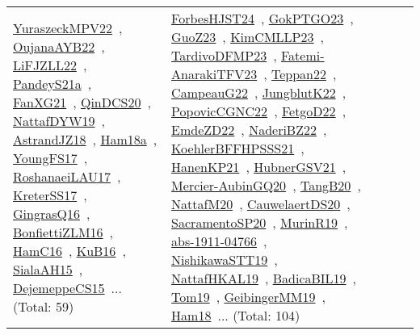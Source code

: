 {\begin{longtable}{lp{3cm}>{\raggedright\arraybackslash}p{6cm}>{\raggedright\arraybackslash}p{6cm}>{\raggedright\arraybackslash}p{8cm}}
\href{../works/YuraszeckMPV22.pdf}{YuraszeckMPV22}~\cite{YuraszeckMPV22}, \href{../works/OujanaAYB22.pdf}{OujanaAYB22}~\cite{OujanaAYB22}, \href{../works/LiFJZLL22.pdf}{LiFJZLL22}~\cite{LiFJZLL22}, \href{../works/PandeyS21a.pdf}{PandeyS21a}~\cite{PandeyS21a}, \href{../works/FanXG21.pdf}{FanXG21}~\cite{FanXG21}, \href{../works/QinDCS20.pdf}{QinDCS20}~\cite{QinDCS20}, \href{../works/NattafDYW19.pdf}{NattafDYW19}~\cite{NattafDYW19}, \href{../works/AstrandJZ18.pdf}{AstrandJZ18}~\cite{AstrandJZ18}, \href{../works/Ham18a.pdf}{Ham18a}~\cite{Ham18a}, \href{../works/YoungFS17.pdf}{YoungFS17}~\cite{YoungFS17}, \href{../works/RoshanaeiLAU17.pdf}{RoshanaeiLAU17}~\cite{RoshanaeiLAU17}, \href{../works/KreterSS17.pdf}{KreterSS17}~\cite{KreterSS17}, \href{../works/GingrasQ16.pdf}{GingrasQ16}~\cite{GingrasQ16}, \href{../works/BonfiettiZLM16.pdf}{BonfiettiZLM16}~\cite{BonfiettiZLM16}, \href{../works/HamC16.pdf}{HamC16}~\cite{HamC16}, \href{../works/KuB16.pdf}{KuB16}~\cite{KuB16}, \href{../works/SialaAH15.pdf}{SialaAH15}~\cite{SialaAH15}, \href{../works/DejemeppeCS15.pdf}{DejemeppeCS15}~\cite{DejemeppeCS15}... (Total: 59) & \href{../works/ForbesHJST24.pdf}{ForbesHJST24}~\cite{ForbesHJST24}, \href{../works/GokPTGO23.pdf}{GokPTGO23}~\cite{GokPTGO23}, \href{../works/GuoZ23.pdf}{GuoZ23}~\cite{GuoZ23}, \href{../works/KimCMLLP23.pdf}{KimCMLLP23}~\cite{KimCMLLP23}, \href{../works/TardivoDFMP23.pdf}{TardivoDFMP23}~\cite{TardivoDFMP23}, \href{../works/Fatemi-AnarakiTFV23.pdf}{Fatemi-AnarakiTFV23}~\cite{Fatemi-AnarakiTFV23}, \href{../works/Teppan22.pdf}{Teppan22}~\cite{Teppan22}, \href{../works/CampeauG22.pdf}{CampeauG22}~\cite{CampeauG22}, \href{../works/JungblutK22.pdf}{JungblutK22}~\cite{JungblutK22}, \href{../works/PopovicCGNC22.pdf}{PopovicCGNC22}~\cite{PopovicCGNC22}, \href{../works/FetgoD22.pdf}{FetgoD22}~\cite{FetgoD22}, \href{../works/EmdeZD22.pdf}{EmdeZD22}~\cite{EmdeZD22}, \href{../works/NaderiBZ22.pdf}{NaderiBZ22}~\cite{NaderiBZ22}, \href{../works/KoehlerBFFHPSSS21.pdf}{KoehlerBFFHPSSS21}~\cite{KoehlerBFFHPSSS21}, \href{../works/HanenKP21.pdf}{HanenKP21}~\cite{HanenKP21}, \href{../works/HubnerGSV21.pdf}{HubnerGSV21}~\cite{HubnerGSV21}, \href{../works/Mercier-AubinGQ20.pdf}{Mercier-AubinGQ20}~\cite{Mercier-AubinGQ20}, \href{../works/TangB20.pdf}{TangB20}~\cite{TangB20}, \href{../works/NattafM20.pdf}{NattafM20}~\cite{NattafM20}, \href{../works/CauwelaertDS20.pdf}{CauwelaertDS20}~\cite{CauwelaertDS20}, \href{../works/SacramentoSP20.pdf}{SacramentoSP20}~\cite{SacramentoSP20}, \href{../works/MurinR19.pdf}{MurinR19}~\cite{MurinR19}, \href{../works/abs-1911-04766.pdf}{abs-1911-04766}~\cite{abs-1911-04766}, \href{../works/NishikawaSTT19.pdf}{NishikawaSTT19}~\cite{NishikawaSTT19}, \href{../works/NattafHKAL19.pdf}{NattafHKAL19}~\cite{NattafHKAL19}, \href{../works/BadicaBIL19.pdf}{BadicaBIL19}~\cite{BadicaBIL19}, \href{../works/Tom19.pdf}{Tom19}~\cite{Tom19}, \href{../works/GeibingerMM19.pdf}{GeibingerMM19}~\cite{GeibingerMM19}, \href{../works/Ham18.pdf}{Ham18}~\cite{Ham18}... (Total: 104)\\

\end{longtable}}
